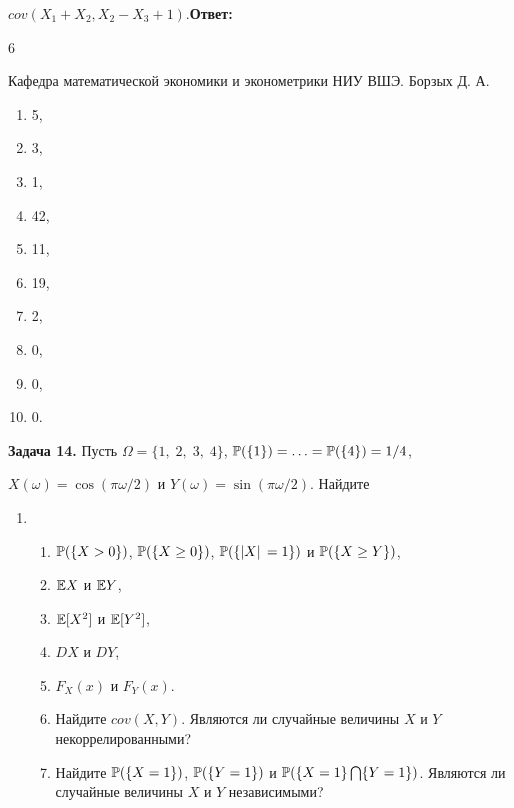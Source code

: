  $cov(X_{1} +X_{2} ,X_{2} -X_{3} +1)$.\textbf{Ответ:}



6

Кафедра математической экономики и эконометрики НИУ ВШЭ. Борзых Д. А.



\begin{enumerate}
\item  5,

\item  3,

\item  1,

\item  42,

\item  11,

\item  19,

\item  2,

\item  0,

\item  0,

\item  0.
\end{enumerate}

\textbf{Задача 14.} Пусть $\Omega =\{ 1,\; 2,\; 3,\; 4\} $, ${\rm {\mathbb P}}(\{ 1\} )=\ldots ={\rm {\mathbb P}}(\{ 4\} )=1/4$, 

$X(\omega )=\cos (\pi \omega /2)$ и $Y(\omega )=\sin (\pi \omega /2)$. Найдите

\begin{enumerate}
\item \begin{enumerate}
\item  ${\rm {\mathbb P}}(\{ X>0\} )$, ${\rm {\mathbb P}}(\{ X\ge 0\} )$, ${\rm {\mathbb P}}(\{ |X|\, =1\} )$ и ${\rm {\mathbb P}}(\{ X\ge Y\} )$, 

\item  ${\rm {\mathbb E}}X$ и ${\rm {\mathbb E}}Y$,

\item  ${\rm {\mathbb E}}[X^{2} ]$ и ${\rm {\mathbb E}}[Y^{2} ]$,

\item  $DX$ и $DY$,

\item  $F_{X} (x)$ и $F_{Y} (x)$.

\item  Найдите $cov(X,Y)$. Являются ли случайные величины $X$ и $Y$ некоррелированными?

\item  Найдите ${\rm {\mathbb P}}(\{ X=1\} )$, ${\rm {\mathbb P}}(\{ Y=1\} )$ и ${\rm {\mathbb P}}(\{ X=1\} \bigcap \{ Y=1\} )$. Являются ли случайные величины $X$ и $Y$ независимыми?
\end{enumerate}
\end{enumerate}

